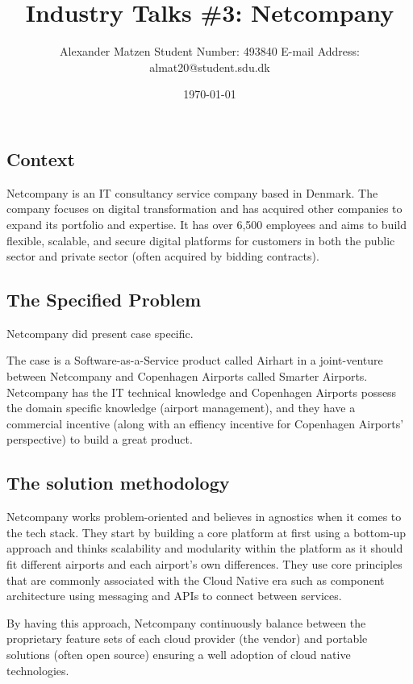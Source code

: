 \documentclass[11pt]{article}
\begin{document}
\setlength\parindent{0pt}
\setlength{\parskip}{.15em}
\pagestyle{empty}

\title{Industry Talks \#3: Netcompany}
\author{Alexander Matzen \addvspace{1em} Student Number: 493840 \newline E-mail Address: almat20@student.sdu.dk}
\date{\today}


\pagecolor{white}



\subsection*{Context}
Netcompany is an IT consultancy service company based in Denmark. The company focuses on digital transformation and has acquired other companies to expand its portfolio and expertise. It has over 6,500 employees and aims to build flexible, scalable, and secure digital platforms for customers in both the public sector and private sector (often acquired by bidding contracts).

\subsection*{The Specified Problem}
Netcompany did present case specific.

The case is a Software-as-a-Service product called Airhart in a joint-venture between Netcompany and Copenhagen Airports called Smarter Airports. Netcompany has the IT technical knowledge and Copenhagen Airports possess the domain specific knowledge (airport management), and they have a commercial incentive (along with an effiency incentive for Copenhagen Airports' perspective) to build a great product.


\subsection*{The solution methodology}
Netcompany works problem-oriented and believes in agnostics when it comes to the tech stack. They start by building a core platform at first using a bottom-up approach and thinks scalability and modularity within the platform as it should fit different airports and each airport's own differences. They use core principles that are commonly associated with the Cloud Native era such as component architecture using messaging and APIs to connect between services.

By having this approach, Netcompany continuously balance between the proprietary feature sets of each cloud provider (the vendor) and portable solutions (often open source) ensuring a well adoption of cloud native technologies.
\end{document}
